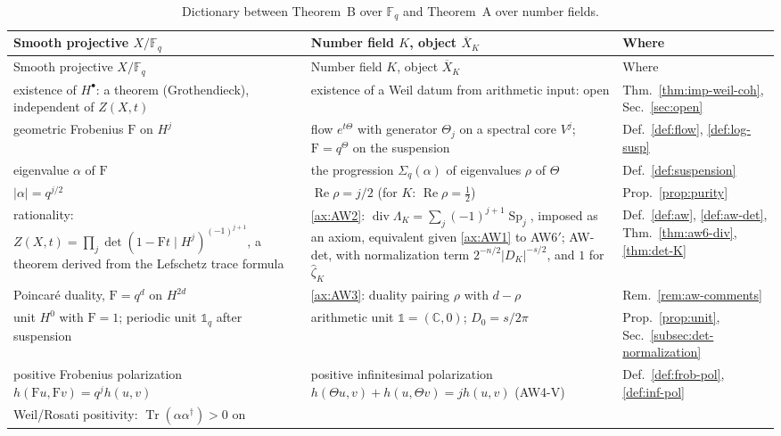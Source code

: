 \documentclass[11pt]{amsart}
\theoremstyle{plain}
\theoremstyle{definition}
\theoremstyle{remark}
\numberwithin{equation}{section}
\newcommand{\C}{\mathbb{C}}
\newcommand{\F}{\mathbb{F}}
\newcommand{\Xbar}{\overline{X}}
\DeclareMathOperator{\Tr}{Tr}
\DeclareMathOperator{\divisor}{div}
\DeclareMathOperator{\Rea}{Re}
\renewcommand{\Re}{\Rea}
\begin{document}
{\small
\begin{longtable}{@{}>{\raggedright\arraybackslash}p{}
>{\raggedright\arraybackslash}p{}
>{\raggedright\arraybackslash}p{}@{}}
\caption{Dictionary between Theorem~B over $\F_q$ and Theorem~A over
number fields.}\label{tab:dictionary}\\
\toprule
Smooth projective $X/\F_q$ & Number field $K$, object $\Xbar_K$ &
Where\\
\midrule
\endfirsthead
\toprule
Smooth projective $X/\F_q$ & Number field $K$, object $\Xbar_K$ &
Where\\
\midrule
\endhead
\bottomrule
\endfoot
existence of $H^\bullet$: a theorem (Grothendieck), independent of
$Z(X,t)$ & existence of a Weil datum from arithmetic input: open &
Thm.~\ref{thm:imp-weil-coh}, Sec.~\ref{sec:open}\\
geometric Frobenius $\mathrm{F}$ on $H^j$ & flow $e^{t\Theta}$ with
generator $\Theta_j$ on a spectral core $V^j$; $\mathrm{F}=q^\Theta$ on
the suspension & Def.~\ref{def:flow}, \ref{def:log-susp}\\
eigenvalue $\alpha$ of $\mathrm{F}$ & the progression
$\Sigma_q(\alpha)$ of eigenvalues $\rho$ of $\Theta$ &
Def.~\ref{def:suspension}\\
$|\alpha|=q^{j/2}$ & $\Re\rho=j/2$ (for $K$: $\Re\rho=\tfrac12$) &
Prop.~\ref{prop:purity}\\
rationality: $Z(X,t)=\prod_j\det(1-\mathrm{F}t\mid H^j)^{(-1)^{j+1}}$,
a theorem derived from the Lefschetz trace formula &
\ref{ax:AW2}: $\divisor\Lambda_K=\sum_j(-1)^{j+1}\operatorname{Sp}_j$,
imposed as an axiom, equivalent given \ref{ax:AW1} to AW6$'$; AW-det,
with normalization term $2^{-n/2}|D_K|^{-s/2}$, and $1$ for
$\widehat\zeta_K$ &
Def.~\ref{def:aw}, \ref{def:aw-det}, Thm.~\ref{thm:aw6-div},
\ref{thm:det-K}\\
Poincar\'e duality, $\mathrm{F}=q^d$ on $H^{2d}$ & \ref{ax:AW3}:
duality pairing $\rho$ with $d-\rho$ & Rem.~\ref{rem:aw-comments}\\
unit $H^0$ with $\mathrm{F}=1$; periodic unit $\mathbb 1_q$ after
suspension & arithmetic unit $\mathbb 1=(\C,0)$; $D_0=s/2\pi$ &
Prop.~\ref{prop:unit}, Sec.~\ref{subsec:det-normalization}\\
positive Frobenius polarization $h(\mathrm{F}u,\mathrm{F}v)=q^jh(u,v)$
& positive infinitesimal polarization $h(\Theta u,v)+h(u,\Theta v)=
jh(u,v)$ (AW4-V) & Def.~\ref{def:frob-pol}, \ref{def:inf-pol}\\
Weil/Rosati positivity: $\Tr(\alpha\alpha^\dagger)>0$ on

\end{longtable}}
\end{document}
